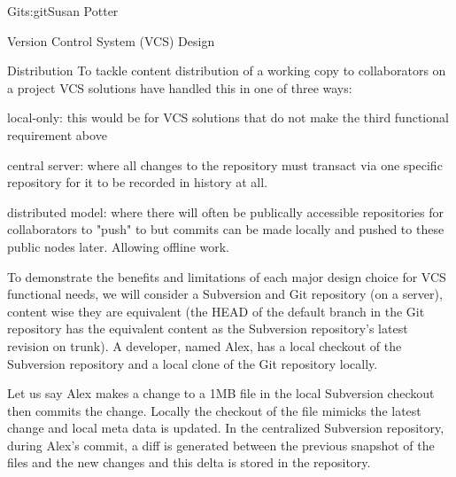 \begin{aosachapter}{Git}{s:git}{Susan Potter}
\begin{aosasect1}{Version Control System (VCS) Design}
\begin{aosasect2}{Distribution}
To tackle content distribution of a working copy to collaborators on a
project VCS solutions have handled this in one of three ways:
\begin{aosaitemize}
  \item local-only: this would be for VCS solutions that do not make the
    third functional requirement above
  \item central server: where all changes to the repository must transact
    via one specific repository for it to be recorded in history at all.
  \item distributed model: where there will often be publically accessible
    repositories for collaborators to "push" to but commits can be made
    locally and pushed to these public nodes later. Allowing offline work.
\end{aosaitemize}

\end{aosasect2}

To demonstrate the benefits and limitations of each major design choice
for VCS functional needs, we will consider a Subversion and Git repository
(on a server), content wise they are equivalent (the HEAD of the default
branch in the Git repository has the equivalent content as the Subversion
repository's latest revision on trunk). A developer, named Alex,
has a local checkout of the Subversion repository and a local clone of the
Git repository locally.

Let us say Alex makes a change to a 1MB file in the local Subversion
checkout then commits the change. Locally the checkout of the file mimicks
the latest change and local meta data is updated. In the centralized
Subversion repository, during Alex's commit, a diff is generated between the
previous snapshot of the files and the new changes and this delta is stored
in the repository.


\end{aosasect1}
\end{aosachapter}
